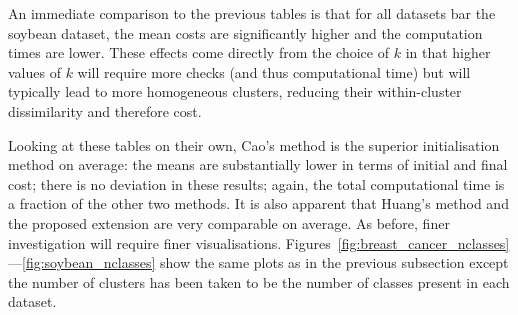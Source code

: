 An immediate comparison to the previous tables is that for all datasets bar the
soybean dataset, the mean costs are significantly higher and the computation
times are lower. These effects come directly from the choice of \(k\) in that
higher values of \(k\) will require more checks (and thus computational time)
but will typically lead to more homogeneous clusters, reducing their
within-cluster dissimilarity and therefore cost.

Looking at these tables on their own, Cao's method is the superior
initialisation method on average: the means are substantially lower in terms of
initial and final cost; there is no deviation in these results; again, the total
computational time is a fraction of the other two methods. It is also apparent
that Huang's method and the proposed extension are very comparable on average.
As before, finer investigation will require finer visualisations.
Figures~\ref{fig:breast_cancer_nclasses}---\ref{fig:soybean_nclasses} show the
same plots as in the previous subsection except the number of clusters has been
taken to be the number of classes present in each dataset.

